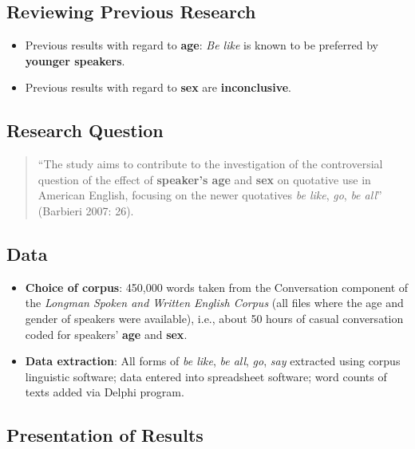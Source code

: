 \documentclass[
  11pt,
  letterpaper,
  DIV=11,
  numbers=noendperiod]{scrreprt}
\providecommand{\tightlist}{%
  \setlength{\itemsep}{0pt}\setlength{\parskip}{0pt}}\usepackage{longtable,booktabs,array}
\begin{document}
\subsection{Reviewing Previous
Research}\label{reviewing-previous-research}

\begin{itemize}
\tightlist
\item
  Previous results with regard to \textbf{age}: \emph{Be like} is known
  to be preferred by \textbf{younger speakers}.
\item
  Previous results with regard to \textbf{sex} are
  \textbf{inconclusive}.
\end{itemize}

\subsection{Research Question}\label{research-question}

\begin{quote}
``The study aims to contribute to the investigation of the controversial
question of the effect of \textbf{speaker's age} and \textbf{sex} on
quotative use in American English, focusing on the newer quotatives
\emph{be like}, \emph{go}, \emph{be all}'' (Barbieri 2007: 26).
\end{quote}

\subsection{Data}\label{data}

\begin{itemize}
\tightlist
\item
  \textbf{Choice of corpus}: 450,000 words taken from the Conversation
  component of the \emph{Longman Spoken and Written English Corpus} (all
  files where the age and gender of speakers were available), i.e.,
  about 50 hours of casual conversation coded for speakers' \textbf{age}
  and \textbf{sex}.
\item
  \textbf{Data extraction}: All forms of \emph{be like}, \emph{be all},
  \emph{go}, \emph{say} extracted using corpus linguistic software; data
  entered into spreadsheet software; word counts of texts added via
  Delphi program.
\end{itemize}

\subsection{Presentation of Results}\label{presentation-of-results}
\end{document}
